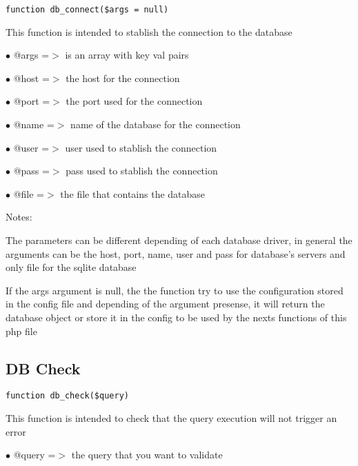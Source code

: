 \documentclass[a4paper]{book}
\begin{document}
\begin{lstlisting}
function db_connect($args = null)
\end{lstlisting}

This function is intended to stablish the connection to the database

\begin{compactitem}
\item[\color{myblue}$\bullet$] @args =$>$ is an array with key val pairs
\item[\color{myblue}$\bullet$] @host =$>$ the host for the connection
\item[\color{myblue}$\bullet$] @port =$>$ the port used for the connection
\item[\color{myblue}$\bullet$] @name =$>$ name of the database for the connection
\item[\color{myblue}$\bullet$] @user =$>$ user used to stablish the connection
\item[\color{myblue}$\bullet$] @pass =$>$ pass used to stablish the connection
\item[\color{myblue}$\bullet$] @file =$>$ the file that contains the database
\end{compactitem}

Notes:

The parameters can be different depending of each database driver, in general the arguments can
be the host, port, name, user and pass for database's servers and only file for the sqlite database

If the args argument is null, the the function try to use the configuration stored in the config file
and depending of the argument presense, it will return the database object or store it in the config
to be used by the nexts functions of this php file

\hypertarget{toc63}{}
\subsection{DB Check}

\begin{lstlisting}
function db_check($query)
\end{lstlisting}

This function is intended to check that the query execution will not trigger an error

\begin{compactitem}
\item[\color{myblue}$\bullet$] @query =$>$ the query that you want to validate
\end{compactitem}
\end{document}
